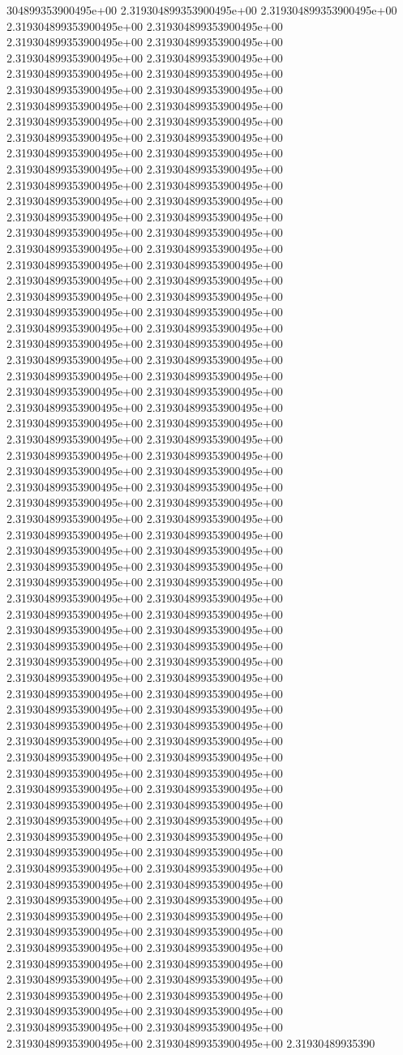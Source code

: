 304899353900495e+00	2.319304899353900495e+00	2.319304899353900495e+00	2.319304899353900495e+00	2.319304899353900495e+00	2.319304899353900495e+00	2.319304899353900495e+00	2.319304899353900495e+00	2.319304899353900495e+00	2.319304899353900495e+00	2.319304899353900495e+00	2.319304899353900495e+00	2.319304899353900495e+00	2.319304899353900495e+00	2.319304899353900495e+00	2.319304899353900495e+00	2.319304899353900495e+00	2.319304899353900495e+00	2.319304899353900495e+00	2.319304899353900495e+00	2.319304899353900495e+00	2.319304899353900495e+00	2.319304899353900495e+00	2.319304899353900495e+00	2.319304899353900495e+00	2.319304899353900495e+00	2.319304899353900495e+00	2.319304899353900495e+00	2.319304899353900495e+00	2.319304899353900495e+00	2.319304899353900495e+00	2.319304899353900495e+00	2.319304899353900495e+00	2.319304899353900495e+00	2.319304899353900495e+00	2.319304899353900495e+00	2.319304899353900495e+00	2.319304899353900495e+00	2.319304899353900495e+00	2.319304899353900495e+00	2.319304899353900495e+00	2.319304899353900495e+00	2.319304899353900495e+00	2.319304899353900495e+00	2.319304899353900495e+00	2.319304899353900495e+00	2.319304899353900495e+00	2.319304899353900495e+00	2.319304899353900495e+00	2.319304899353900495e+00	2.319304899353900495e+00	2.319304899353900495e+00	2.319304899353900495e+00	2.319304899353900495e+00	2.319304899353900495e+00	2.319304899353900495e+00	2.319304899353900495e+00	2.319304899353900495e+00	2.319304899353900495e+00	2.319304899353900495e+00	2.319304899353900495e+00	2.319304899353900495e+00	2.319304899353900495e+00	2.319304899353900495e+00	2.319304899353900495e+00	2.319304899353900495e+00	2.319304899353900495e+00	2.319304899353900495e+00	2.319304899353900495e+00	2.319304899353900495e+00	2.319304899353900495e+00	2.319304899353900495e+00	2.319304899353900495e+00	2.319304899353900495e+00	2.319304899353900495e+00	2.319304899353900495e+00	2.319304899353900495e+00	2.319304899353900495e+00	2.319304899353900495e+00	2.319304899353900495e+00	2.319304899353900495e+00	2.319304899353900495e+00	2.319304899353900495e+00	2.319304899353900495e+00	2.319304899353900495e+00	2.319304899353900495e+00	2.319304899353900495e+00	2.319304899353900495e+00	2.319304899353900495e+00	2.319304899353900495e+00	2.319304899353900495e+00	2.319304899353900495e+00	2.319304899353900495e+00	2.319304899353900495e+00	2.319304899353900495e+00	2.319304899353900495e+00	2.319304899353900495e+00	2.319304899353900495e+00	2.319304899353900495e+00	2.319304899353900495e+00	2.319304899353900495e+00	2.319304899353900495e+00	2.319304899353900495e+00	2.319304899353900495e+00	2.319304899353900495e+00	2.319304899353900495e+00	2.319304899353900495e+00	2.319304899353900495e+00	2.319304899353900495e+00	2.319304899353900495e+00	2.319304899353900495e+00	2.319304899353900495e+00	2.319304899353900495e+00	2.319304899353900495e+00	2.319304899353900495e+00	2.319304899353900495e+00	2.319304899353900495e+00	2.319304899353900495e+00	2.319304899353900495e+00	2.319304899353900495e+00	2.319304899353900495e+00	2.319304899353900495e+00	2.319304899353900495e+00	2.319304899353900495e+00	2.319304899353900495e+00	2.319304899353900495e+00	2.319304899353900495e+00	2.319304899353900495e+00	2.319304899353900495e+00	2.319304899353900495e+00	2.319304899353900495e+00	2.319304899353900495e+00	2.319304899353900495e+00	2.31930489935390